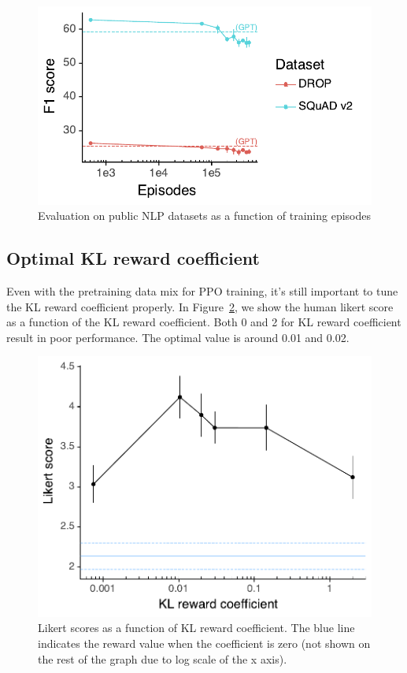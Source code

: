 \documentclass{article}
\begin{document}
\begin{figure}
    \centering
    \includegraphics[width=0.8\linewidth]{figs/academic-evals-v-episodes.pdf}
    \caption{Evaluation on public NLP datasets as a function of training episodes}
    \label{fig:public-nlp-evals-v-episodes}
\end{figure}

\subsection{Optimal KL reward coefficient}

Even with the pretraining data mix for PPO training, it's still important to tune the KL reward coefficient properly. In Figure~\ref{fig:likert-v-kl-with-pretrain}, we show the human likert score as a function of the KL reward coefficient. Both 0 and 2 for KL reward coefficient result in poor performance. The optimal value is around 0.01 and 0.02.

\begin{figure}
    \centering
    \includegraphics[width=0.6\linewidth]{figs/likert-v-kl-rew-coef.pdf}
    \caption{Likert scores as a function of KL reward coefficient. The blue line indicates the reward value when the coefficient is zero (not shown on the rest of the graph due to log scale of the x axis).}
    \label{fig:likert-v-kl-with-pretrain}
\end{figure}
\end{document}
